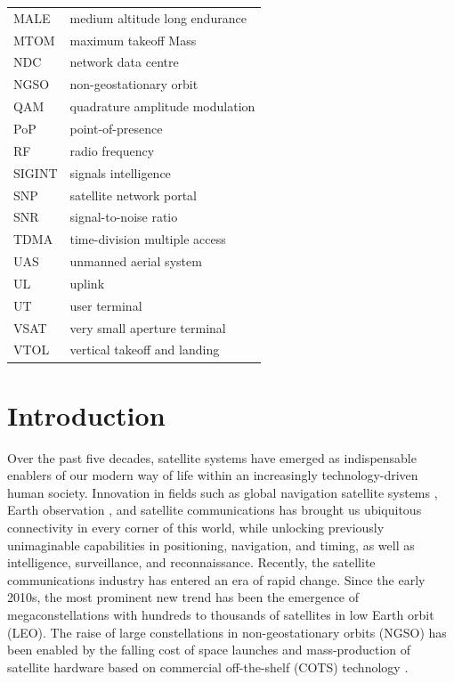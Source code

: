 \documentclass[english, 12pt, a4paper, elec, utf8, a-1b, online]{aaltothesis}
\begin{document}
\begin{tabular}{ll}
MALE                    & medium altitude long endurance \\
MTOM                    & maximum takeoff Mass \\
NDC                     & network data centre \\
NGSO                    & non-geostationary orbit \\
QAM                     & quadrature amplitude modulation \\
PoP                     & point-of-presence \\
RF                      & radio frequency \\
SIGINT                  & signals intelligence \\
SNP                     & satellite network portal \\
SNR                     & signal-to-noise ratio \\
TDMA                    & time-division multiple access \\
UAS                     & unmanned aerial system \\
UL                      & uplink \\
UT                      & user terminal \\
VSAT                    & very small aperture terminal \\
VTOL                    & vertical takeoff and landing
\end{tabular}

\cleardoublepage

\section{Introduction}


Over the past five decades, satellite systems have emerged as indispensable enablers of our modern way of life within an increasingly technology-driven human society.
Innovation in fields such as global navigation satellite systems \cite{oconnor2019economic}, Earth observation \cite{lupi2022socioeconomic, tassa2020socioeconomic}, and satellite communications \cite{euspa-secure-satcom-2023, euroconsult-space-economy-2023} has brought us ubiquitous connectivity in every corner of this world, while unlocking previously unimaginable capabilities in positioning, navigation, and timing, as well as intelligence, surveillance, and reconnaissance.
Recently, the satellite communications industry has entered an era of rapid change.
Since the early 2010s, the most prominent new trend has been the emergence of megaconstellations with hundreds to thousands of satellites in low Earth orbit (LEO).
The raise of large constellations in non-geostationary orbits (NGSO) has been enabled by the falling cost of space launches and mass-production of satellite hardware based on commercial off-the-shelf (COTS) technology \cite{euroconsult-space-economy-2023}.
\end{document}
